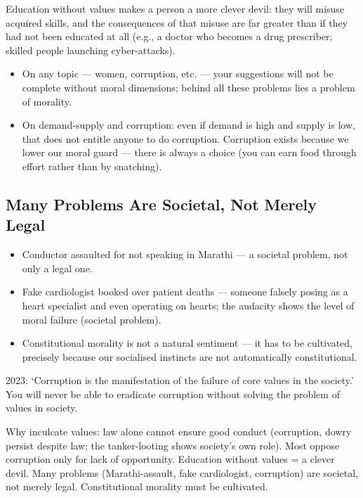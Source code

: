 \begin{CriticalPoint}
Education without values makes a person a more clever devil: they will misuse acquired skills, and the consequences of that misuse are far greater than if they had not been educated at all (e.g., a doctor who becomes a drug prescriber; skilled people launching cyber-attacks).
\end{CriticalPoint}

\begin{itemize}
\item On any topic --- women, corruption, etc. --- your suggestions will not be complete without moral dimensions; behind all these problems lies a problem of morality.
\item On demand-supply and corruption: even if demand is high and supply is low, that does not entitle anyone to do corruption. Corruption exists because we lower our moral guard --- there is always a choice (you can earn food through effort rather than by snatching).
\end{itemize}

\subsection{Many Problems Are Societal, Not Merely Legal}

\begin{itemize}
\item Conductor assaulted for not speaking in Marathi --- a societal problem, not only a legal one.
\item Fake cardiologist booked over patient deaths --- someone falsely posing as a heart specialist and even operating on hearts; the audacity shows the level of moral failure (societal problem).
\item Constitutional morality is not a natural sentiment --- it has to be cultivated, precisely because our socialised instincts are not automatically constitutional.
\end{itemize}

\begin{PYQLink}
2023: `Corruption is the manifestation of the failure of core values in the society.' You will never be able to eradicate corruption without solving the problem of values in society.
\end{PYQLink}

\begin{QuickRevision}
Why inculcate values: law alone cannot ensure good conduct (corruption, dowry persist despite law; the tanker-looting shows society's own role). Most oppose corruption only for lack of opportunity. Education without values = a clever devil. Many problems (Marathi-assault, fake cardiologist, corruption) are societal, not merely legal. Constitutional morality must be cultivated.
\end{QuickRevision}

